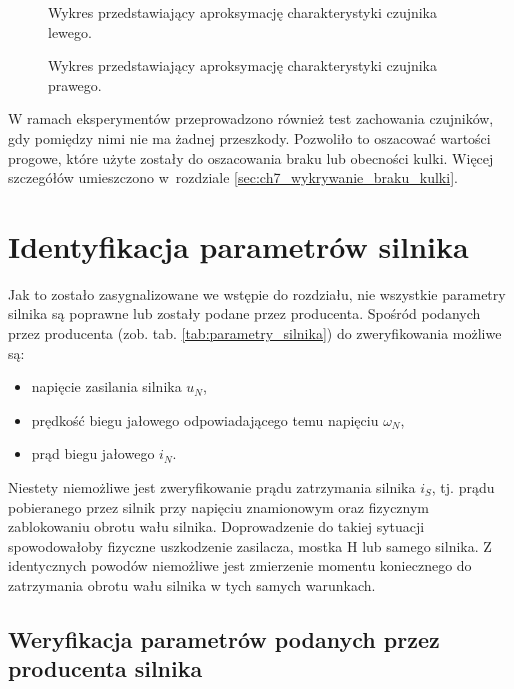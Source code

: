 \begin{figure}[h]
    \centering
    
    \caption{Wykres przedstawiający aproksymację charakterystyki czujnika lewego.}
    \label{fig:aproksymacja_czujnika_lewego}
\end{figure}

\begin{figure}[H]
    \centering
    
    \caption{Wykres przedstawiający aproksymację charakterystyki czujnika prawego.}
    \label{fig:aproksymacja_czujnika_prawego}
\end{figure}

W ramach eksperymentów przeprowadzono również test zachowania czujników, gdy pomiędzy nimi nie ma żadnej przeszkody. Pozwoliło to oszacować wartości progowe, które użyte zostały do oszacowania braku lub obecności kulki. Więcej szczegółów umieszczono w~rozdziale \ref{sec:ch7_wykrywanie_braku_kulki}.

\section{Identyfikacja parametrów silnika}
\label{sec:ch6_identyfikacja_parametrow_silnika}

Jak to zostało zasygnalizowane we wstępie do rozdziału, nie wszystkie parametry silnika są poprawne lub zostały podane przez producenta. Spośród podanych przez producenta (zob. tab. \ref{tab:parametry_silnika}) do zweryfikowania możliwe są:

\begin{itemize}
    \item napięcie zasilania silnika $u_N$,
    \item prędkość biegu jałowego odpowiadającego temu napięciu $\omega_N$,
    \item prąd biegu jałowego $i_N$.
\end{itemize}

Niestety niemożliwe jest zweryfikowanie prądu zatrzymania silnika $i_S$, tj. prądu pobieranego przez silnik przy napięciu znamionowym oraz fizycznym zablokowaniu obrotu wału silnika. Doprowadzenie do takiej sytuacji spowodowałoby fizyczne uszkodzenie zasilacza, mostka H lub samego silnika. Z identycznych powodów niemożliwe jest zmierzenie momentu koniecznego do zatrzymania obrotu wału silnika w tych samych warunkach.

\subsection{Weryfikacja parametrów podanych przez producenta silnika}
\label{subsec:ch6_weryfikacja_parametrow_producenta_silnika}

